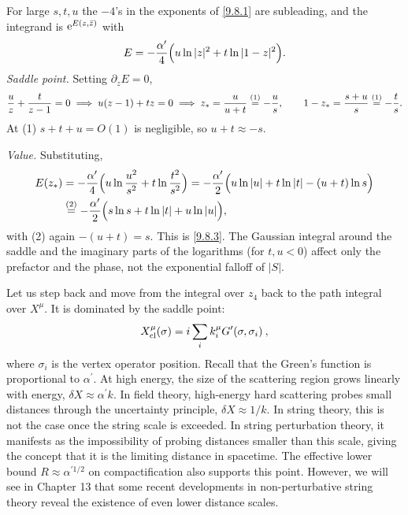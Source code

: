 \begin{tcolorbox}[breakable]
	\begin{remark}
		For large $s,t,u$ the $-4$'s in the exponents of \eqref{9.8.1} are subleading, and the integrand is $\mathrm{e}^{E(z,\bar z)}$ with
		\begin{equation*}
			E=-\frac{\alpha'}{4}\Bigl(u\ln|z|^2+t\ln|1-z|^2\Bigr).
		\end{equation*}
		\emph{Saddle point.} Setting $\partial_zE=0$,
		\begin{equation*}
			\frac uz+\frac{t}{z-1}=0\;\Longrightarrow\;u(z-1)+tz=0\;\Longrightarrow\;z_*=\frac{u}{u+t}\overset{(1)}{=}-\frac us ,\qquad 1-z_*=\frac{s+u}{s}\overset{(1)}{=}-\frac ts .
		\end{equation*}
		At (1) $s+t+u=O(1)$ is negligible, so $u+t\approx-s$.

		\emph{Value.} Substituting,
		\begin{align*}
			E(z_*)&=-\frac{\alpha'}{4}\Bigl(u\ln\frac{u^2}{s^2}+t\ln\frac{t^2}{s^2}\Bigr)
			=-\frac{\alpha'}{2}\Bigl(u\ln|u|+t\ln|t|-(u+t)\ln s\Bigr)\\
			&\overset{(2)}{=}-\frac{\alpha'}{2}\Bigl(s\ln s+t\ln|t|+u\ln|u|\Bigr),
		\end{align*}
		with (2) again $-(u+t)=s$. This is \eqref{9.8.3}. The Gaussian integral around the saddle and the imaginary parts of the logarithms (for $t,u<0$) affect only the prefactor and the phase, not the exponential falloff of $|S|$.
	\end{remark}
\end{tcolorbox}
Let us step back and move from the integral over $z_{4}$ back to the path integral over $X^{\mu}$. It is dominated by the saddle point:
\begin{equation}
	X_{\mathrm{cl}}^{\mu}(\sigma) = i \sum_{i} k_{i}^{\mu} G^{\prime}(\sigma, \sigma_{i}) \:, \label{9.8.4}
\end{equation}
where $\sigma_{i}$ is the vertex operator position. Recall that the Green's function is proportional to $\alpha^{\prime}$.
At high energy, the size of the scattering region grows linearly with energy, $\delta X \approx \alpha^{\prime} k$. 
In field theory, high-energy hard scattering probes small distances through the uncertainty principle, $\delta X \approx 1 / k$. In string theory, this is not the case once the string scale is exceeded. 
In string perturbation theory, it manifests as the impossibility of probing distances smaller than this scale, giving the concept that it is the limiting distance in spacetime.
The effective lower bound $R \approx \alpha^{\prime 1/2}$ on compactification also supports this point. However, we will see in Chapter 13 that some recent developments in non-perturbative string theory reveal the existence of even lower distance scales.

